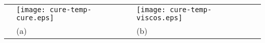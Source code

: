 \documentclass[10pt,a4paper]{article}
\begin{document}
\begin{tabular}{l@{}l@{}l}
  &\texttt{[image: cure-temp-cure.eps]}&                \texttt{[image: cure-temp-viscos.eps]}\\
  &(a)&(b)
\end{tabular}
\end{document}
